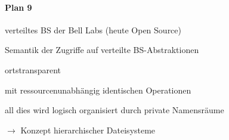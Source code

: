 \documentclass[a4paper]{article}
\begin{document}
\begin{multicols}{3}
    \paragraph{Plan 9}
    \begin{itemize*}
        \item verteiltes BS der Bell Labs (heute Open Source)
        \item Semantik der Zugriffe auf verteilte BS-Abstraktionen
        \begin{itemize*}
            \item ortstransparent
            \item mit ressourcenunabhängig identischen Operationen %
        \end{itemize*}
        \item all dies wird logisch organisiert durch private Namensräume
        \item[$\rightarrow$] Konzept hierarchischer Dateisysteme
    \end{itemize*}

\end{multicols}
\end{document}
